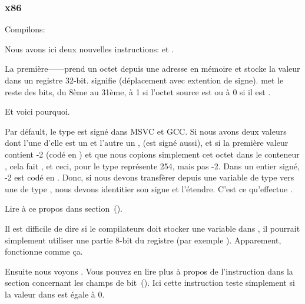 \subsubsection{x86}


Compilons:




Nous avons ici deux nouvelles instructions: \MOVSX et \TEST.

\label{MOVSX}

La première---\MOVSX---prend un octet depuis une adresse en mémoire et stocke la
valeur dans un registre 32-bit. 
\MOVSX signifie  (déplacement avec extention de signe).
\MOVSX met le reste des bits, du 8ème au 31ème, à 1 si l'octet source est 
ou à 0 si il est .

Et voici pourquoi.

Par défault, le type \Tchar est signé dans MSVC et GCC. Si nous avons deux valeurs
dont l'une d'elle est un \Tchar et l'autre un \Tint, (\Tint est signé aussi), et
si la première valeur contient -2 (codé en ) et que nous copions simplement
cet octet dans le conteneur \Tint, cela fait , et ceci, pour le type
\Tint représente 254, mais pas -2. Dans un entier signé, -2 est codé en .
Donc, si nous devons transfèrer  depuis une variable de type \Tchar vers
une de type \Tint, nous devons identitier son signe et l'étendre. C'est ce qu'effectue
\MOVSX.

Lire à ce propos dans \q{\IT{\SignedNumbersSectionName}} section~().

Il est difficile de dire si le compilateurs doit stocker une variable \Tchar dans
\EDX, il pourrait simplement utiliser une partie 8-bit du registre (par exemple \DL).
Apparement,  fonctionne comme
ça.


Ensuite nous voyons .
Vous pouvez en lire plus à propos de l'instruction \TEST dans la section concernant
les champs de bit~().
Ici cette instruction teste simplement si la valeur dans \EDX est égale à 0.


